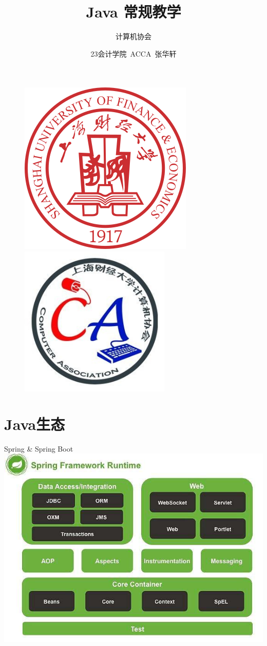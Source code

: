 \documentclass[UTF8, 16pt]{beamer}
\author[计算机协会] %
{
计算机协会
}
\title[Java 常规教学]{Java 常规教学}
\subtitle{}
\institute[SUFE]
{
上海财经大学
}
\date{23会计学院\ ACCA\ 张华轩}
\begin{document}
\begin{frame}[noframenumbering]
    \titlepage{}
    \vspace{-0.5cm}
    \begin{figure}[htpb]
        \begin{center}
            \includegraphics[width=0.19 \linewidth]{sufe_logo.png}
            \quad
            \includegraphics[width=0.19 \linewidth]{ca_logo.png}
        \end{center}
    \end{figure}
\end{frame}


\section{Java生态}
\begin{frame}
    \centering
    \textcolor{sufered}{Spring \& Spring Boot}
    \includegraphics[width=0.95\linewidth]{ch1/spring.png}
\end{frame}
\end{document}
